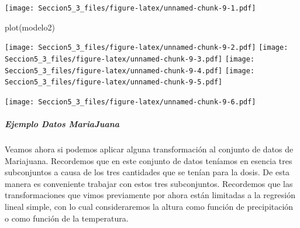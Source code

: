 \documentclass[
]{article}
\newenvironment{Shaded}{\begin{snugshade}}{\end{snugshade}}
\newcommand{\AttributeTok}[1]{\textcolor[rgb]{0.77,0.63,0.00}{#1}}
\newcommand{\CommentTok}[1]{\textcolor[rgb]{0.56,0.35,0.01}{\textit{#1}}}
\newcommand{\DecValTok}[1]{\textcolor[rgb]{0.00,0.00,0.81}{#1}}
\newcommand{\FunctionTok}[1]{\textcolor[rgb]{0.00,0.00,0.00}{#1}}
\newcommand{\NormalTok}[1]{#1}
\newcommand{\SpecialCharTok}[1]{\textcolor[rgb]{0.00,0.00,0.00}{#1}}
\newcommand{\StringTok}[1]{\textcolor[rgb]{0.31,0.60,0.02}{#1}}
\begin{document}
\begin{Shaded}
\end{Shaded}

\texttt{[image: Seccion5\_3\_files/figure-latex/unnamed-chunk-9-1.pdf]}

\begin{Shaded}
\begin{Highlighting}[]
\FunctionTok{plot}\NormalTok{(modelo2)}
\end{Highlighting}
\end{Shaded}

\texttt{[image: Seccion5\_3\_files/figure-latex/unnamed-chunk-9-2.pdf]}
\texttt{[image: Seccion5\_3\_files/figure-latex/unnamed-chunk-9-3.pdf]}
\texttt{[image: Seccion5\_3\_files/figure-latex/unnamed-chunk-9-4.pdf]}
\texttt{[image: Seccion5\_3\_files/figure-latex/unnamed-chunk-9-5.pdf]}

\begin{Shaded}
\end{Shaded}

\texttt{[image: Seccion5\_3\_files/figure-latex/unnamed-chunk-9-6.pdf]}

\begin{Shaded}
\end{Shaded}

\hypertarget{ejemplo-datos-mariajuana}{%
\subparagraph{\texorpdfstring{\textbf{Ejemplo Datos
MariaJuana}}{Ejemplo Datos MariaJuana}}\label{ejemplo-datos-mariajuana}}

Veamos ahora si podemos aplicar alguna transformación al conjunto de
datos de Mariajuana. Recordemos que en este conjunto de datos teníamos
en esencia tres subconjuntos a causa de los tres cantidades que se
tenían para la dosis. De esta manera es conveniente trabajar con estos
tres subconjuntos. Recordemos que las transformaciones que vimos
previamente por ahora están limitadas a la regresión lineal simple, con
lo cual consideraremos la altura como función de precipitación o como
función de la temperatura.
\end{document}
